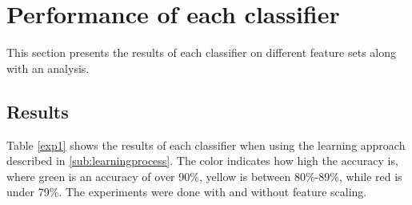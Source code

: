 \documentclass[USenglish]{ifimaster}  %
\begin{document}
 
\section{Performance of each classifier}\label{result_exp1}
This section presents the results of each classifier on different feature sets along with an analysis.
	
\subsection{Results}
Table \ref{exp1} shows the results of each classifier when using the learning approach described in \ref{sub:learningprocess}. The color indicates how high the accuracy is, where green is an accuracy of over 90\%, yellow is between 80\%-89\%, while red is under 79\%. The experiments were done with and without feature scaling.  
\end{document}
